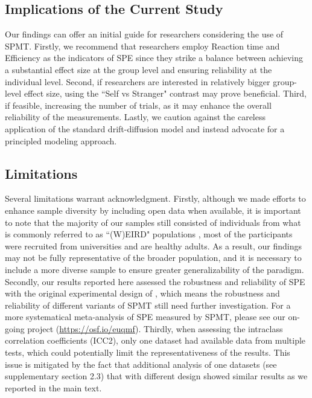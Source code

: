 \documentclass[sn-apa]{sn-jnl}%
\theoremstyle{thmstyleone}%
\theoremstyle{thmstyletwo}%
\theoremstyle{thmstylethree}%
\begin{document}
\subsection{Implications of the Current Study}\label{subsec:impl}
Our findings can offer an initial guide for researchers considering the use of SPMT. Firstly, we recommend that researchers employ Reaction time and Efficiency as the indicators of SPE since they strike a balance between achieving a substantial effect size at the group level and ensuring reliability at the individual level. Second, if researchers are interested in relatively bigger group-level effect size, using the ``Self vs Stranger" contrast may prove beneficial. Third, if feasible, increasing the number of trials, as it may enhance the overall reliability of the measurements. Lastly, we caution against the careless application of the standard drift-diffusion model and instead advocate for a principled modeling approach.

\subsection{Limitations}\label{subsec:lim}
Several limitations warrant acknowledgment. Firstly, although we made efforts to enhance sample diversity by including open data when available, it is important to note that the majority of our samples still consisted of individuals from what is commonly referred to as ``(W)EIRD" populations \parencite{rad2018toward,yue2023weird}, most of the participants were recruited from universities and are healthy adults. As a result, our findings may not be fully representative of the broader population, and it is necessary to include a more diverse sample to ensure greater generalizability of the paradigm. Secondly, our results reported here assessed the robustness and reliability of SPE with the original experimental design of \textcite{sui2012perceptual}, which means the robustness and reliability of different variants of SPMT still need further investigation. For a more systematical meta-analysis of SPE measured by SPMT, please see our on-going project (\url{https://osf.io/euqmf}). Thirdly, when assessing the intraclass correlation coefficients (ICC2), only one dataset had available  data from multiple tests, which could potentially limit the representativeness of the results. This issue is mitigated by the fact that additional analysis of one datasets (see supplementary section 2.3) that with different design showed similar results as we reported in the main text. 
\end{document}
